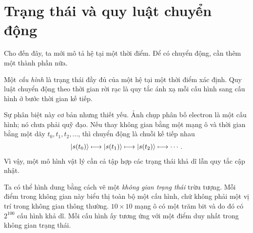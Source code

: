 \begin{classroomqa}
\end{classroomqa}

\section{Trạng thái và quy luật chuyển động}

Cho đến đây, ta mới mô tả hệ tại một thời điểm. Để có chuyển động, cần thêm một thành phần nữa.

\begin{definition}Một \emph{cấu hình} là trạng thái đầy đủ của một hệ tại một thời điểm xác định. Quy luật chuyển động theo thời gian rời rạc là quy tắc ánh xạ mỗi cấu hình sang cấu hình ở bước thời gian kế tiếp.\end{definition}

Sự phân biệt này cơ bản nhưng thiết yếu. Ảnh chụp phân bố electron là một cấu hình; nó chưa phải quỹ đạo. Nếu thay không gian bằng một mạng ô và thời gian bằng một dãy \(t_0,t_1,t_2,\ldots\), thì chuyển động là chuỗi kế tiếp nhau
\begin{equation}
  \left\lvert s(t_0)\right\rangle
  \longmapsto
  \left\lvert s(t_1)\right\rangle
  \longmapsto
  \left\lvert s(t_2)\right\rangle
  \longmapsto\cdots.
  \label{eq:l01-discrete-motion}
\end{equation}
Vì vậy, một mô hình vật lý cần cả tập hợp các trạng thái khả dĩ lẫn quy tắc cập nhật.

\begin{classroomqa}
\end{classroomqa}

Ta có thể hình dung bằng cách vẽ một \emph{không gian trạng thái} trừu tượng. Mỗi điểm trong không gian này biểu thị toàn bộ một cấu hình, chứ không phải một vị trí trong không gian thông thường. \(10\times10\) mạng ô có một trăm bit và do đó có \(2^{100}\) cấu hình khả dĩ. Mỗi cấu hình ấy tương ứng với một điểm duy nhất trong không gian trạng thái.

